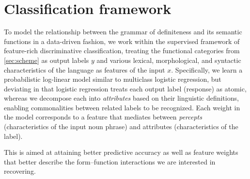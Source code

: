 \documentclass[11pt,letterpaper]{article}
\newcommand{\ensuretext}[1]{#1}
\newcommand{\nssmarker}{\ensuretext{\textcolor{magenta}{\ensuremath{^{\textsc{NS}}_{\textsc{S}}}}}}
\newcommand{\arkcomment}[3]{\ensuretext{\textcolor{#3}{[#1 #2]}}}
\newcommand{\nss}[1]{\arkcomment{\nssmarker}{#1}{magenta}}
\newcommand{\costversion}[1]{}
\begin{document}
\section{Classification framework}\label{sec:modeling}

To model the relationship between the grammar of definiteness and its semantic functions in a data-driven fashion,
we work within the supervised framework of feature-rich discriminative classification, 
treating the functional categories from \cref{sec:scheme} as output labels $y$
and various lexical, morphological, and syntactic characteristics of the language as features of the input $x$.
Specifically, we learn a probabilistic log-linear model similar to multiclass logistic regression, 
but deviating in that
logistic regression treats each output label (response) as atomic, whereas 
we decompose each into \emph{attributes} based on their linguistic definitions, 
enabling commonalities between related labels to be recognized.
Each weight in the model corresponds to a feature that mediates between 
\emph{percepts} (characteristics of the input noun phrase) and attributes (characteristics of the label).
\costversion{\nss{}the following ways:
\begin{itemize}
  \item Logistic regression treats each output label (response) as atomic; 
  we decompose each into \emph{attributes} based on their linguistic definitions, 
  enabling commonalities between related labels to be recognized.
  Each weight in the model corresponds to a feature that mediates between 
  \emph{percepts} (characteristics of the input noun phrase) and attributes (characteristics of the label).
  \item Logistic regression assumes a prediction is either correct or incorrect.
  We incorporate a \emph{cost function} that gives partial credit during learning when a related label 
  is predicted, so the learned model will better match our evaluation measure.
  \item Logistic regression assumes the space of possible predictions matches 
  the space of labels observed in the training data; we allow more abstract labels to be predicted, 
  which can receive partial credit. The scoring scheme encourages the predictor to ``back off'' 
  to a coarser label if it is not sufficiently confident about a fine-grained label.
\end{itemize}
These decisions are\nss{}}
This is aimed at attaining better predictive accuracy 
as well as feature weights that better describe the form--function interactions we are interested in recovering.
\end{document}

